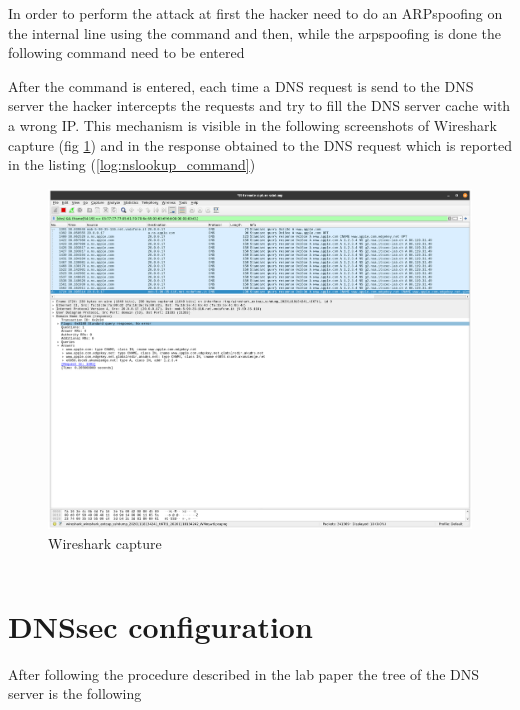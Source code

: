 In order to perform the attack at first the hacker need to do an ARPspoofing on the internal line using the command  and  then, while the arpspoofing is done the following command need to be entered 

After the command is entered, each time a DNS request is send to the DNS server the hacker intercepts the requests and try to fill the DNS server cache with a wrong IP. This mechanism is visible in the following screenshots of Wireshark capture (fig \ref{fig:Wireshark_capture}) and in the response obtained to the DNS request which is reported in the listing (\ref{log:nslookup_command})

\begin{figure}[H]
	\centering
	\includegraphics[width=\linewidth]{images/cache_poisoning_wireshark_log.png}
	\caption{Wireshark capture}
	\label{fig:Wireshark_capture}
\end{figure}

\inputminted{text}{cachepoisoning_loca_log.txt}
\label{log:nslookup_command}


\section{DNSsec configuration}
After following the procedure described in the lab paper the tree of the DNS server is the following

